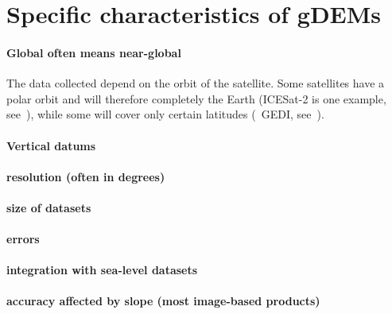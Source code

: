 %
\section[Specific characteristics]{Specific characteristics of gDEMs}

\paragraph{Global often means near-global}

The data collected depend on the orbit of the satellite.
Some satellites have a polar orbit and will therefore completely the Earth (ICESat-2 is one example, see~), while some will cover only certain latitudes (\eg\ GEDI, see~).


\paragraph{Vertical datums}


\paragraph{resolution (often in degrees)}




\paragraph{size of datasets}



\paragraph{errors}


\paragraph{integration with sea-level datasets}


\paragraph{accuracy affected by slope (most image-based products)}



